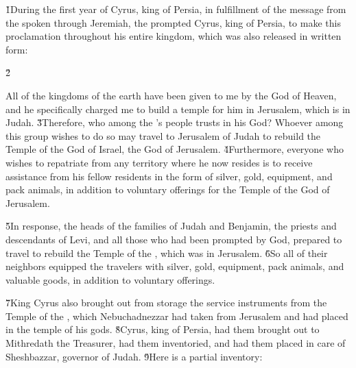 


\v{1}During the first year of Cyrus, king of Persia, in fulfillment of the message from the  spoken through Jeremiah, the  prompted Cyrus, king of Persia, to make this proclamation throughout his entire kingdom, which was also released in written form:

\v{2}

 

\begin{poetry}
\poeml All of the kingdoms of the earth have been given to me by the  God of Heaven, and he specifically charged me to build a temple for him in Jerusalem, which is in Judah. \v{3}Therefore, who among the 's people trusts in his God? Whoever among this group wishes to do so may travel to Jerusalem of Judah to rebuild the Temple of the  God of Israel, the God of Jerusalem. \v{4}Furthermore, everyone who wishes to repatriate from any territory where he now resides is to receive assistance from his fellow residents in the form of silver, gold, equipment, and pack animals, in addition to voluntary offerings for the Temple of the God of Jerusalem.
\end{poetry}

\v{5}In response, the heads of the families of Judah and Benjamin, the priests and descendants of Levi, and all those who had been prompted by God, prepared to travel to rebuild the Temple of the , which was in Jerusalem. \v{6}So all of their neighbors equipped the travelers with silver, gold, equipment, pack animals, and valuable goods, in addition to voluntary offerings.

\v{7}King Cyrus also brought out from storage the service instruments from the Temple of the , which Nebuchadnezzar had taken from Jerusalem and had placed in the temple of his gods. \v{8}Cyrus, king of Persia, had them brought out to Mithredath the Treasurer, had them inventoried, and had them placed in care of Sheshbazzar, governor of Judah. \v{9}Here is a partial inventory:

